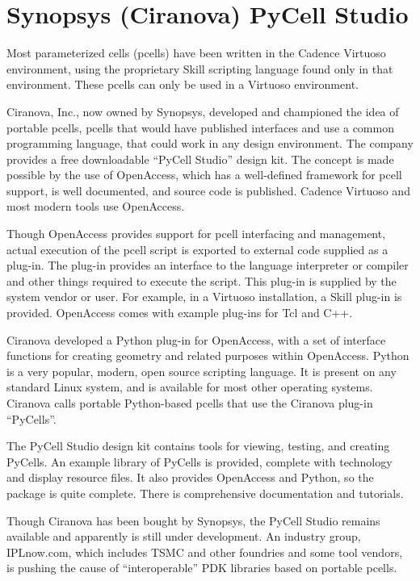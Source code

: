 \ifoa
\section{Synopsys (Ciranova) PyCell Studio}
\label{ciranova}
 
Most parameterized cells (pcells) have been written in the Cadence
Virtuoso environment, using the proprietary Skill scripting language
found only in that environment.  These pcells can only be used in a
Virtuoso environment.

Ciranova, Inc., now owned by Synopsys, developed and championed the
idea of portable pcells, pcells that would have published interfaces
and use a common programming language, that could work in any design
environment.  The company provides a free downloadable ``PyCell
Studio'' design kit.  The concept is made possible by the use of
OpenAccess, which has a well-defined framework for pcell support, is
well documented, and source code is published.  Cadence Virtuoso and
most modern tools use OpenAccess.

Though OpenAccess provides support for pcell interfacing and
management, actual execution of the pcell script is exported to
external code supplied as a plug-in.  The plug-in provides an
interface to the language interpreter or compiler and other things
required to execute the script.  This plug-in is supplied by the
system vendor or user.  For example, in a Virtuoso installation, a
Skill plug-in is provided.  OpenAccess comes with example plug-ins for
Tcl and C++.

Ciranova developed a Python plug-in for OpenAccess, with a set of
interface functions for creating geometry and related purposes within
OpenAccess.  Python is a very popular, modern, open source scripting
language.  It is present on any standard Linux system, and is
available for most other operating systems.  Ciranova calls portable
Python-based pcells that use the Ciranova plug-in ``PyCells''.

The PyCell Studio design kit contains tools for viewing, testing, and
creating PyCells.  An example library of PyCells is provided, complete
with technology and display resource files.  It also provides
OpenAccess and Python, so the package is quite complete.  There is
comprehensive documentation and tutorials.

Though Ciranova has been bought by Synopsys, the PyCell Studio remains
available and apparently is still under development.  An industry
group, IPLnow.com, which includes TSMC and other foundries and some
tool vendors, is pushing the cause of ``interoperable'' PDK libraries
based on portable pcells.


